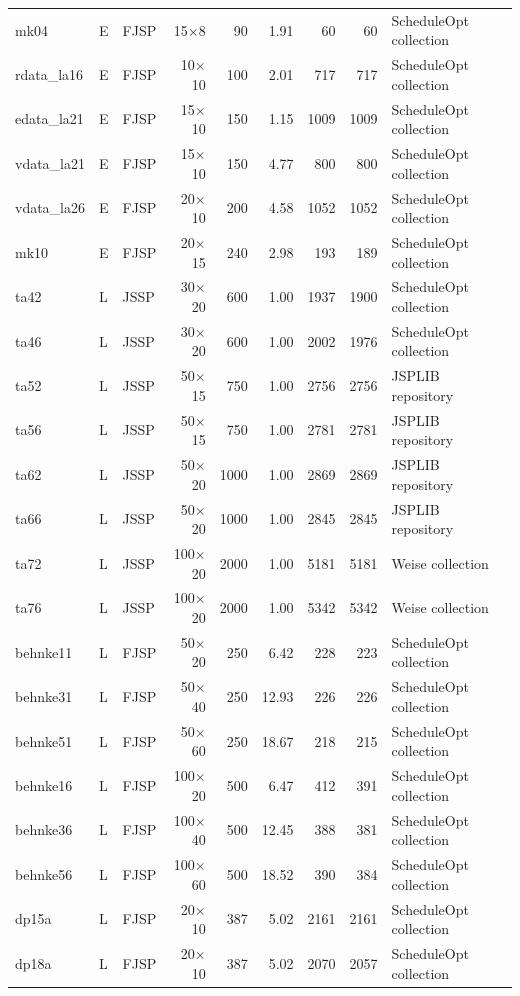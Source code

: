{\begin{longtable}{lllrrrrrl}
mk04 & E & FJSP & 15$\times$8 & 90 & 1.91 & 60 & 60 & ScheduleOpt collection \\
rdata\_la16 & E & FJSP & 10$\times$10 & 100 & 2.01 & 717 & 717 & ScheduleOpt collection \\
edata\_la21 & E & FJSP & 15$\times$10 & 150 & 1.15 & 1009 & 1009 & ScheduleOpt collection \\
vdata\_la21 & E & FJSP & 15$\times$10 & 150 & 4.77 & 800 & 800 & ScheduleOpt collection \\
vdata\_la26 & E & FJSP & 20$\times$10 & 200 & 4.58 & 1052 & 1052 & ScheduleOpt collection \\
mk10 & E & FJSP & 20$\times$15 & 240 & 2.98 & 193 & 189 & ScheduleOpt collection \\
\midrule
ta42 & L & JSSP & 30$\times$20 & 600 & 1.00 & 1937 & 1900 & ScheduleOpt collection \\
ta46 & L & JSSP & 30$\times$20 & 600 & 1.00 & 2002 & 1976 & ScheduleOpt collection \\
ta52 & L & JSSP & 50$\times$15 & 750 & 1.00 & 2756 & 2756 & JSPLIB repository \\
ta56 & L & JSSP & 50$\times$15 & 750 & 1.00 & 2781 & 2781 & JSPLIB repository \\
ta62 & L & JSSP & 50$\times$20 & 1000 & 1.00 & 2869 & 2869 & JSPLIB repository \\
ta66 & L & JSSP & 50$\times$20 & 1000 & 1.00 & 2845 & 2845 & JSPLIB repository \\
ta72 & L & JSSP & 100$\times$20 & 2000 & 1.00 & 5181 & 5181 & Weise collection \\
ta76 & L & JSSP & 100$\times$20 & 2000 & 1.00 & 5342 & 5342 & Weise collection \\
behnke11 & L & FJSP & 50$\times$20 & 250 & 6.42 & 228 & 223 & ScheduleOpt collection \\
behnke31 & L & FJSP & 50$\times$40 & 250 & 12.93 & 226 & 226 & ScheduleOpt collection \\
behnke51 & L & FJSP & 50$\times$60 & 250 & 18.67 & 218 & 215 & ScheduleOpt collection \\
behnke16 & L & FJSP & 100$\times$20 & 500 & 6.47 & 412 & 391 & ScheduleOpt collection \\
behnke36 & L & FJSP & 100$\times$40 & 500 & 12.45 & 388 & 381 & ScheduleOpt collection \\
behnke56 & L & FJSP & 100$\times$60 & 500 & 18.52 & 390 & 384 & ScheduleOpt collection \\
dp15a & L & FJSP & 20$\times$10 & 387 & 5.02 & 2161 & 2161 & ScheduleOpt collection \\
dp18a & L & FJSP & 20$\times$10 & 387 & 5.02 & 2070 & 2057 & ScheduleOpt collection \\
\end{longtable}}
